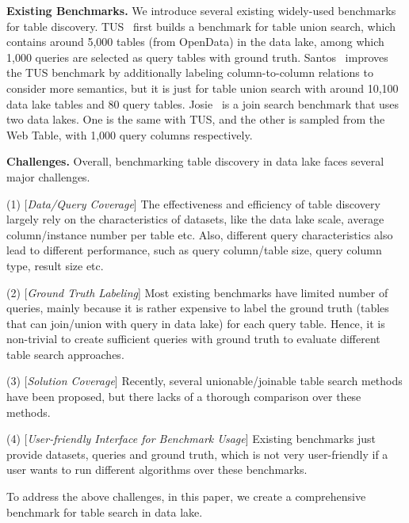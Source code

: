 \noindent \textbf{Existing Benchmarks.} We introduce several existing widely-used benchmarks for  table discovery.
TUS~\cite{TUS} first builds a benchmark for table union search, which contains around 5,000 tables (from OpenData) in the data lake, among which 1,000 queries are selected as query tables with ground truth. 
Santos~\cite{Santos} improves the TUS benchmark by additionally labeling column-to-column relations to consider more semantics, but it is just for table union search with around 10,100 data lake tables and 80 query tables.
Josie~\cite{Josie} is a join search benchmark that uses two data lakes. One is the same with TUS, and the other is sampled from the Web Table, with 1,000 query columns respectively. 

\noindent \textbf{Challenges.} Overall, benchmarking table discovery in data lake faces several major challenges.

\noindent (1) [\textit{Data/Query Coverage}] The effectiveness and efficiency of table discovery largely rely on the characteristics of datasets, like the data lake scale, average column/instance number per table etc. Also, different query  characteristics also lead to different performance, such as query column/table size,  query column type,  result size etc. 

\noindent (2) [\textit{Ground Truth Labeling}] 
 Most existing benchmarks have limited number of queries,  mainly because it is rather expensive to label the ground truth (tables  that can join/union with query in data lake) for each query table. Hence, it is non-trivial to create sufficient queries with ground truth to evaluate different table search approaches.

\noindent (3) [\textit{Solution Coverage}] 
Recently, several unionable/joinable table search methods have been proposed, but there lacks of a thorough comparison over these methods.

\noindent (4) [\textit{User-friendly Interface for Benchmark Usage}] Existing benchmarks just provide datasets, queries and ground truth, which is not very user-friendly if a user wants to
run different algorithms over these benchmarks.


To address the above challenges, in this paper, we create a comprehensive benchmark \sys for table search in data lake.

